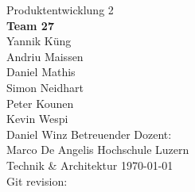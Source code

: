     \begin{titlepage}
        \begin{center}
            \makeatletter
            {\Large Produktentwicklung 2} \\
            \vfill{}
            {\LARGE \@title}
            \vfill{}
            {\textbf{Team 27} \\
            Yannik Küng \\
            Andriu Maissen \\
            Daniel Mathis \\
            Simon Neidhart \\
            Peter Kounen \\
            Kevin Wespi \\
            Daniel Winz}
            \vfill{}
            {Betreuender Dozent: \\
            Marco De Angelis}
            \vfill{}
            {Hochschule Luzern \\
            Technik \& Architektur}
            \vfill
            {\today \\
            Git revision: 
            }
            \makeatother
        \end{center}
    \end{titlepage}
